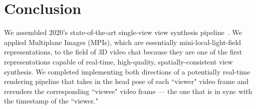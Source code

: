 \section{Conclusion}\label{sec:conclusion}

We assembled 2020’s state-of-the-art single-view view synthesis pipeline~\cite{single_view_mpi}. We applied Multiplane Images (MPIs), which are essentially mini-local-light-field representations, to the field of 3D video chat because they are one of the first representations capable of real-time, high-quality, spatially-consistent view synthesis. We completed implementing both directions of a potentially real-time rendering pipeline that takes in the head pose of each ``viewer" video frame and rerenders the corresponding ``viewee" video frame --- the one that is in sync with the timestamp of the ``viewer."
